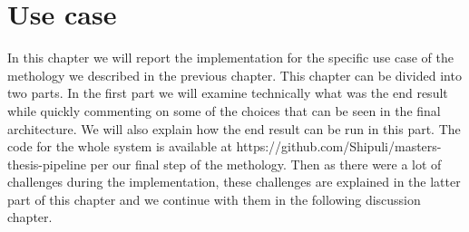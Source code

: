 \chapter{Use case}
\label{chapter:implementation}



In this chapter we will report the implementation for the specific use case of the methology we described in the previous chapter.
This chapter can be divided into two parts.
In the first part we will examine technically what was the end result while quickly commenting on some of the choices that can be seen in the final architecture.
We will also explain how the end result can be run in this part.
The code for the whole system is available at https://github.com/Shipuli/masters-thesis-pipeline per our final step of the methology.
Then as there were a lot of challenges during the implementation, these challenges are explained in the latter part of this chapter and we continue with them in the following discussion chapter.





